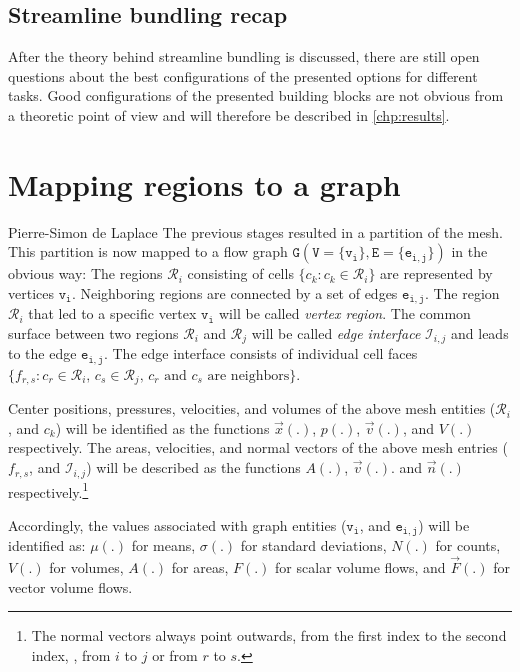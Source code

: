 \subsection{Streamline bundling recap}
After the theory behind streamline bundling is discussed, there are still open questions about the best configurations of the presented options for different tasks. Good configurations of the presented building blocks are not obvious from a theoretic point of view and will therefore be described in \autoref{chp:results}.


\section{Mapping regions to a graph}
\label{sec:theory:map-regions-to-graph}

{Pierre-Simon de Laplace}
%
The previous stages resulted in a partition of the \threed mesh. This partition is now mapped to a flow graph $\mathtt{G}(\mathtt{V}=\{\mathtt{v_i}\}, \mathtt{E}=\{\mathtt{e_{i,j}}\})$ in the obvious way: The regions $\mathcal{R}_i$ consisting of cells $\{c_k:c_k\in\mathcal{R}_i\}$ are represented by vertices $\mathtt{v_i}$. Neighboring regions are connected by a set of edges $\mathtt{e_{i,j}}$. The region $\mathcal{R}_i$ that led to a specific vertex $\mathtt{v_i}$ will be called \emph{vertex region}. The common surface between two regions $\mathcal{R}_i$ and $\mathcal{R}_j$ will be called \emph{edge interface} $\mathcal{I}_{i,j}$ and leads to the edge $\mathtt{e_{i,j}}$. The edge interface consists of individual cell faces $\{f_{r,s}:c_r\in\mathcal{R}_i,\, c_s\in\mathcal{R}_j,\,c_r \text{ and } c_s \text{ are neighbors}\}$.

Center positions, pressures, velocities, and volumes of the above \threed mesh entities ($\mathcal{R}_i$, and $c_k$) will be identified as the functions $\vec{x}(.)$, $p(.)$, $\vec{v}(.)$, and $V(.)$ respectively. The areas, velocities, and normal vectors of the above \twod mesh entries ($f_{r,s}$, and $\mathcal{I}_{i,j}$) will be described as the functions $A(.)$, $\vec{v}(.)$. and $\vec{n}(.)$ respectively.\footnote{The normal vectors always point outwards, from the first index to the second index, \ie, from $i$ to $j$ or from $r$ to $s$.}

Accordingly, the values associated with graph entities ($\mathtt{v_i}$, and $\mathtt{e_{i,j}}$) will be identified as: $\mu(.)$ for means, $\sigma(.)$ for standard deviations, $N(.)$ for counts, $V(.)$ for volumes, $A(.)$ for areas, $F(.)$ for scalar volume flows, and $\vec{F}(.)$ for vector volume flows. 

